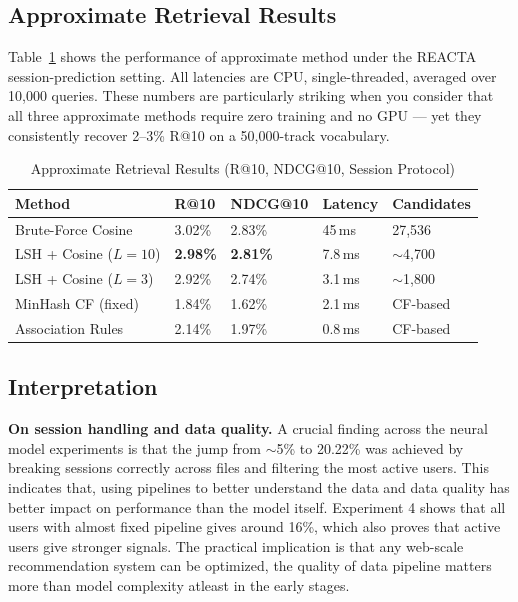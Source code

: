 \documentclass[conference]{IEEEtran}
\begin{document}
\subsection{Approximate Retrieval Results}

Table~\ref{tab:approx} shows the performance of approximate method under the
REACTA session-prediction setting. All latencies are CPU, single-threaded,
averaged over 10,000 queries. These numbers are particularly striking when you
consider that all three approximate methods require zero training and no GPU
--- yet they consistently recover 2--3\% R@10 on a 50,000-track vocabulary.

\begin{table}[t]
\caption{Approximate Retrieval Results (R@10, NDCG@10, Session Protocol)}
\label{tab:approx}
\centering
\footnotesize
\begin{tabular}{lllll}
\toprule
Method & R@10 & NDCG@10 & Latency & Candidates \\
\midrule
Brute-Force Cosine  & 3.02\% & 2.83\% & 45\,ms  & 27{,}536 \\
LSH + Cosine ($L=10$) & \textbf{2.98\%} & \textbf{2.81\%} & 7.8\,ms & $\sim$4{,}700 \\
LSH + Cosine ($L=3$)  & 2.92\% & 2.74\% & 3.1\,ms & $\sim$1{,}800 \\
MinHash CF (fixed)    & 1.84\% & 1.62\% & 2.1\,ms & CF-based \\
Association Rules     & 2.14\% & 1.97\% & 0.8\,ms & CF-based \\
\bottomrule
\end{tabular}
\end{table}

\subsection{Interpretation}

\textbf{On session handling and data quality.}
A crucial finding across the neural model experiments is that the jump from
$\sim$5\% to 20.22\% was achieved by breaking sessions correctly across files
and filtering the most active users. This indicates that, using pipelines to
better understand the data and data quality has better impact on performance
than the model itself. Experiment 4 shows that all users with almost fixed
pipeline gives around 16\%, which also proves that active users give stronger
signals. The practical implication is that any web-scale recommendation system
can be optimized, the quality of data pipeline matters more than model
complexity atleast in the early stages.
\end{document}
